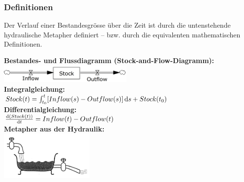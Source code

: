\subsubsection{Definitionen}
Der Verlauf einer Bestandesgrösse über die Zeit ist durch die untenstehende hydraulische Metapher definiert – bzw. durch die equivalenten mathematischen Definitionen.\\
\begin{multicols}{2}
	\textbf{Bestandes- und Flussdiagramm (Stock-and-Flow-Diagramm):} \\
	\includegraphics[width=0.5\textwidth]{pictures/badewanne_stock} \\
	\textbf{Integralgleichung:} \\
	$Stock(t) = \int_{t_0}^{t} \! {[Inflow(s)-Outflow(s)]} \, \mathrm{d}{s}+Stock(t_0)$\\
	\textbf{Differentialgleichung:} \\
	$\frac{\mathrm{d}{(Stock(t))}}{\mathrm{d}{t}} = Inflow(t) - Outflow(t)$ \\
	\textbf{Metapher aus der Hydraulik:} \\
	\includegraphics[width=0.35\textwidth]{pictures/badewanne}
\end{multicols}

